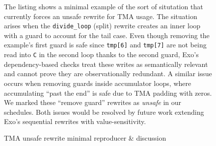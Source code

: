 
\begin{figure}[h!]
\sporkCodeRule
\begin{minipage}{0.275\linewidth}
\end{minipage}
\begin{minipage}{0.700\linewidth}
\vspace{2pt}
The listing shows a minimal example of the sort of situtation that currently forces an unsafe rewrite for TMA usage.
The situation arises when the \texttt{divide\_loop} (split) rewrite creates an inner loop with a guard
to account for the tail case.
Even though removing the example's first guard is safe since \texttt{tmp[6]} and \texttt{tmp[7]} are not being read into \texttt{C}
in the second loop thanks to the second guard,
Exo's dependency-based checks treat these writes as semantically relevant and cannot prove they are observationally redundant.
A similar issue occurs when removing guards inside accumulator loops,
where accumulating ``past the end'' is safe due to TMA padding with zeros.
We marked these ``remove guard'' rewrites as \emph{unsafe} in our schedules.
Both issues would be resolved by future work extending Exo's sequential rewrites with value-sensitivity.
\end{minipage}
\caption{TMA unsafe rewrite minimal reproducer \& discussion}
\label{fig:TmaUnsafeRewrite}
\sporkCodeRule
\end{figure}
